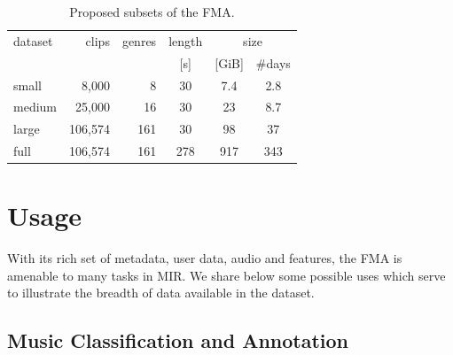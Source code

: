 \documentclass{article}
\newcommand{\ntracks}{106,574 }
\newcommand{\tduration}{343 }
\newcommand{\aduration}{278 }
\newcommand{\size}{917 }
\begin{document}
\begin{table}
	\small
	\centering
	\begin{tabular}{lrrccc}
		\toprule
		dataset & clips & genres & length & \multicolumn{2}{c}{size} \\
		\cmidrule{5-6}
		        &       &        &  [s]   & [GiB] & \#days \\
		\midrule
		small  &    8,000 &   8 &  30 &  7.4 & 2.8  \\
		medium &   25,000 &  16 &  30 & 23   & 8.7  \\
		large  & \ntracks & 161 &  30 & 98   & 37 \\
		full   & \ntracks & 161 & \aduration & \size & \tduration  \\
		\bottomrule
	\end{tabular}
	\caption{Proposed subsets of the FMA.}
	\label{tab:subsets}
\end{table}


\section{Usage} %


With its rich set of metadata, user data, audio and features, the FMA is amenable to many tasks in MIR. We share below some possible uses which serve to illustrate the breadth of data available in the dataset.




\subsection{Music Classification and Annotation}
\end{document}
